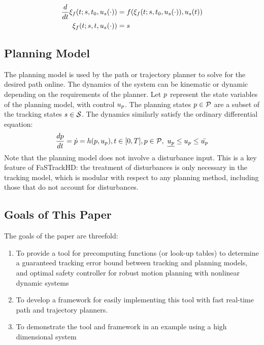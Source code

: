 \begin{equation}
\label{eq:fdyn_traj}
\begin{aligned}
\frac{d}{dt}\xi_{f}(t; s, t_0, u_s(\cdot)) &= f(\xi_{f}(t; s, t_0, u_s(\cdot)), u_s(t)) \\
\xi_{f}(t; s, t, u_s(\cdot)) &= s
\end{aligned}
\end{equation}

\subsection{Planning Model}
The planning model is used by the path or trajectory planner to solve for the desired path online. The dynamics of the system can be kinematic or dynamic depending on the requirements of the planner. Let $p$ represent the state variables of the planning model, with control $u_p$. The planning states $p \in \mathcal{P}$ are a subset of the tracking states $s \in \mathcal{S}$. The dynamics similarly satisfy the ordinary differential equation:
\begin{equation}
\begin{aligned}
\label{eq:pdyn}
\frac{dp}{dt} = \dot{p} = h(p, u_p), t \in [0, T], p \in \mathcal{P}, \ \underline{u_p} \leq u_p \leq \bar{u_p}
\end{aligned}
\end{equation}
Note that the planning model does not involve a disturbance input. This is a key feature of FaSTrackHD: the treatment of disturbances is only necessary in the tracking model, which is modular with respect to any planning method, including those that do not account for disturbances.

\subsection{Goals of This Paper}
The goals of the paper are threefold:
\begin{enumerate}
	\item To provide a tool for precomputing functions (or look-up tables) to determine a guaranteed tracking error bound between tracking and planning models, and optimal safety controller for robust motion planning with nonlinear dynamic systems
	\item To develop a framework for easily implementing this tool with fast real-time path and trajectory planners.
	\item To demonstrate the tool and framework in an example using a high dimensional system
\end{enumerate}
